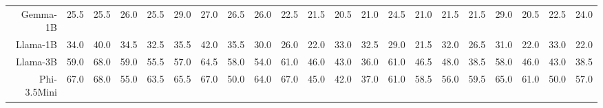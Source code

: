 \begin{table}[t]
{\begin{tabular}{rrrrr|rrrr|rrrr|rrrr|rrrr}
Gemma-1B & \cellcolor[HTML]{FAD8CC}25.5 & \cellcolor[HTML]{FAD8CC}25.5 & \cellcolor[HTML]{FAD9CC}26.0 & \cellcolor[HTML]{FAD8CC}25.5 & \cellcolor[HTML]{FBDECC}29.0 & \cellcolor[HTML]{FBDBCC}27.0 & \cellcolor[HTML]{FBDACC}26.5 & \cellcolor[HTML]{FBDACC}26.0 & \cellcolor[HTML]{F9D1CC}22.5 & \cellcolor[HTML]{F9D0CC}21.5 & \cellcolor[HTML]{F8CECC}20.5 & \cellcolor[HTML]{F9CFCC}21.0 & \cellcolor[HTML]{FAD4CC}24.5 & \cellcolor[HTML]{F8CECC}21.0 & \cellcolor[HTML]{F9CFCC}21.5 & \cellcolor[HTML]{F9CFCC}21.5 & \cellcolor[HTML]{FBDDCC}29.0 & \cellcolor[HTML]{F8CECC}20.5 & \cellcolor[HTML]{F9D2CC}22.5 & \cellcolor[HTML]{FAD4CC}24.0 \\
Llama-1B & \cellcolor[HTML]{FDE5CC}34.0 & \cellcolor[HTML]{FEEECC}40.0 & \cellcolor[HTML]{FDE6CC}34.5 & \cellcolor[HTML]{FCE3CC}32.5 & \cellcolor[HTML]{FDE8CC}35.5 & \cellcolor[HTML]{FFF2CC}42.0 & \cellcolor[HTML]{FDE8CC}35.5 & \cellcolor[HTML]{FCE0CC}30.0 & \cellcolor[HTML]{FAD7CC}26.0 & \cellcolor[HTML]{F9D1CC}22.0 & \cellcolor[HTML]{FCE1CC}33.0 & \cellcolor[HTML]{FCE0CC}32.5 & \cellcolor[HTML]{FBDCCC}29.0 & \cellcolor[HTML]{F9CFCC}21.5 & \cellcolor[HTML]{FCE1CC}32.0 & \cellcolor[HTML]{FAD8CC}26.5 & \cellcolor[HTML]{FCE0CC}31.0 & \cellcolor[HTML]{F9D1CC}22.0 & \cellcolor[HTML]{FCE3CC}33.0 & \cellcolor[HTML]{F9D1CC}22.0 \\
Llama-3B & \cellcolor[HTML]{DEECCC}59.0 & \cellcolor[HTML]{CCE8CC}68.0 & \cellcolor[HTML]{DEECCC}59.0 & \cellcolor[HTML]{E5EDCC}55.5 & \cellcolor[HTML]{E0ECCC}57.0 & \cellcolor[HTML]{D1E9CC}64.5 & \cellcolor[HTML]{DEECCC}58.0 & \cellcolor[HTML]{E7EDCC}54.0 & \cellcolor[HTML]{DDEBCC}61.0 & \cellcolor[HTML]{FBF1CC}46.0 & \cellcolor[HTML]{FFF0CC}43.0 & \cellcolor[HTML]{FDE6CC}36.0 & \cellcolor[HTML]{D6EACC}61.0 & \cellcolor[HTML]{F6F0CC}46.5 & \cellcolor[HTML]{F3F0CC}48.0 & \cellcolor[HTML]{FEEBCC}38.5 & \cellcolor[HTML]{DCEBCC}58.0 & \cellcolor[HTML]{F6F0CC}46.0 & \cellcolor[HTML]{FDF2CC}43.0 & \cellcolor[HTML]{FEECCC}38.5 \\
Phi-3.5Mini & \cellcolor[HTML]{CEE8CC}67.0 & \cellcolor[HTML]{CCE8CC}68.0 & \cellcolor[HTML]{E6EDCC}55.0 & \cellcolor[HTML]{D5EACC}63.5 & \cellcolor[HTML]{CFE9CC}65.5 & \cellcolor[HTML]{CCE8CC}67.0 & \cellcolor[HTML]{EFEFCC}50.0 & \cellcolor[HTML]{D2E9CC}64.0 & \cellcolor[HTML]{D1E9CC}67.0 & \cellcolor[HTML]{FDF2CC}45.0 & \cellcolor[HTML]{FEEFCC}42.0 & \cellcolor[HTML]{FDE7CC}37.0 & \cellcolor[HTML]{D6EACC}61.0 & \cellcolor[HTML]{DCEBCC}58.5 & \cellcolor[HTML]{E1ECCC}56.0 & \cellcolor[HTML]{D9EBCC}59.5 & \cellcolor[HTML]{CCE8CC}65.0 & \cellcolor[HTML]{D5EACC}61.0 & \cellcolor[HTML]{EDEFCC}50.0 & \cellcolor[HTML]{DEEBCC}57.0 \\

\end{tabular}}
\end{table}
